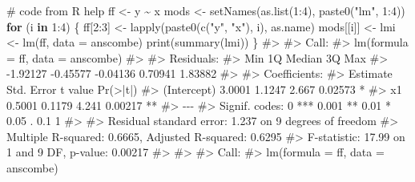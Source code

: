 \documentclass[
  letterpaper,
  DIV=11,
  numbers=noendperiod]{scrreprt}
\newenvironment{Shaded}{\begin{snugshade}}{\end{snugshade}}
\newcommand{\AttributeTok}[1]{\textcolor[rgb]{0.40,0.45,0.13}{#1}}
\newcommand{\CommentTok}[1]{\textcolor[rgb]{0.37,0.37,0.37}{#1}}
\newcommand{\ControlFlowTok}[1]{\textcolor[rgb]{0.00,0.23,0.31}{\textbf{#1}}}
\newcommand{\DecValTok}[1]{\textcolor[rgb]{0.68,0.00,0.00}{#1}}
\newcommand{\FunctionTok}[1]{\textcolor[rgb]{0.28,0.35,0.67}{#1}}
\newcommand{\NormalTok}[1]{\textcolor[rgb]{0.00,0.23,0.31}{#1}}
\newcommand{\OtherTok}[1]{\textcolor[rgb]{0.00,0.23,0.31}{#1}}
\newcommand{\SpecialCharTok}[1]{\textcolor[rgb]{0.37,0.37,0.37}{#1}}
\newcommand{\StringTok}[1]{\textcolor[rgb]{0.13,0.47,0.30}{#1}}
\begin{document}
\begin{Shaded}
\begin{Highlighting}[]
\CommentTok{\# code from R help}
\NormalTok{ff }\OtherTok{\textless{}{-}}\NormalTok{ y }\SpecialCharTok{\textasciitilde{}}\NormalTok{ x}
\NormalTok{mods }\OtherTok{\textless{}{-}} \FunctionTok{setNames}\NormalTok{(}\FunctionTok{as.list}\NormalTok{(}\DecValTok{1}\SpecialCharTok{:}\DecValTok{4}\NormalTok{), }\FunctionTok{paste0}\NormalTok{(}\StringTok{"lm"}\NormalTok{, }\DecValTok{1}\SpecialCharTok{:}\DecValTok{4}\NormalTok{))}
\ControlFlowTok{for}\NormalTok{ (i }\ControlFlowTok{in} \DecValTok{1}\SpecialCharTok{:}\DecValTok{4}\NormalTok{) \{}
\NormalTok{    ff[}\DecValTok{2}\SpecialCharTok{:}\DecValTok{3}\NormalTok{] }\OtherTok{\textless{}{-}} \FunctionTok{lapply}\NormalTok{(}\FunctionTok{paste0}\NormalTok{(}\FunctionTok{c}\NormalTok{(}\StringTok{"y"}\NormalTok{, }\StringTok{"x"}\NormalTok{), i), as.name)}
\NormalTok{    mods[[i]] }\OtherTok{\textless{}{-}}\NormalTok{ lmi }\OtherTok{\textless{}{-}} \FunctionTok{lm}\NormalTok{(ff, }\AttributeTok{data =}\NormalTok{ anscombe)}
    \FunctionTok{print}\NormalTok{(}\FunctionTok{summary}\NormalTok{(lmi))}
\NormalTok{\}}
\CommentTok{\#\textgreater{} }
\CommentTok{\#\textgreater{} Call:}
\CommentTok{\#\textgreater{} lm(formula = ff, data = anscombe)}
\CommentTok{\#\textgreater{} }
\CommentTok{\#\textgreater{} Residuals:}
\CommentTok{\#\textgreater{}      Min       1Q   Median       3Q      Max }
\CommentTok{\#\textgreater{} {-}1.92127 {-}0.45577 {-}0.04136  0.70941  1.83882 }
\CommentTok{\#\textgreater{} }
\CommentTok{\#\textgreater{} Coefficients:}
\CommentTok{\#\textgreater{}             Estimate Std. Error t value Pr(\textgreater{}|t|)   }
\CommentTok{\#\textgreater{} (Intercept)   3.0001     1.1247   2.667  0.02573 * }
\CommentTok{\#\textgreater{} x1            0.5001     0.1179   4.241  0.00217 **}
\CommentTok{\#\textgreater{} {-}{-}{-}}
\CommentTok{\#\textgreater{} Signif. codes:  0 \textquotesingle{}***\textquotesingle{} 0.001 \textquotesingle{}**\textquotesingle{} 0.01 \textquotesingle{}*\textquotesingle{} 0.05 \textquotesingle{}.\textquotesingle{} 0.1 \textquotesingle{} \textquotesingle{} 1}
\CommentTok{\#\textgreater{} }
\CommentTok{\#\textgreater{} Residual standard error: 1.237 on 9 degrees of freedom}
\CommentTok{\#\textgreater{} Multiple R{-}squared:  0.6665, Adjusted R{-}squared:  0.6295 }
\CommentTok{\#\textgreater{} F{-}statistic: 17.99 on 1 and 9 DF,  p{-}value: 0.00217}
\CommentTok{\#\textgreater{} }
\CommentTok{\#\textgreater{} }
\CommentTok{\#\textgreater{} Call:}
\CommentTok{\#\textgreater{} lm(formula = ff, data = anscombe)}

\end{Highlighting}
\end{Shaded}
\end{document}
